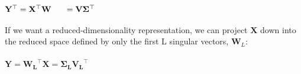 \documentclass[10pt,a4paper]{article}
\newcommand{\tab}{\hspace*{1.6em}}
\begin{document}
\begin{math} \mathbf{Y}^\top  = \mathbf{X}^\top\mathbf{W} \\ \tab = \mathbf{V}\mathbf{\Sigma}^\top  \end{math} \\\\
If we want a reduced-dimensionality representation, we can project \begin{math} \mathbf X  \end{math} down into the reduced space defined by only the first L singular vectors, \begin{math}  \mathbf W_L: \end{math} \\\\
\begin{math} \mathbf{Y}=\mathbf{W_L}^\top\mathbf{X} = \mathbf{\Sigma_L}\mathbf{V_L}^\top \end{math} \\ \\
\end{document}
